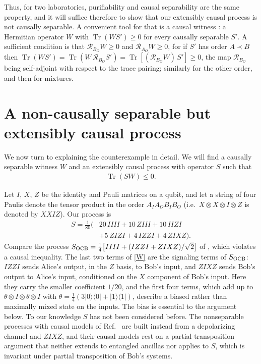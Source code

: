 \documentclass[aps,prl,reprint,superscriptaddress,nofootinbib,longbibliography,raggedbottom]{revtex4-2}
\DeclareMathOperator{\Tr}{Tr}
\newcommand{\R}{\mathcal R}
\newcommand{\ket}[1]{\lvert #1\rangle}
\newcommand{\bra}[1]{\langle #1\rvert}
\newcommand{\proj}[1]{\ket{#1}\!\bra{#1}}
\begin{document}
Thus, for two laboratories, purifiability and causal separability are the
same property, and it will suffice therefore to show that our extensibly causal process is not causally
separable. A convenient tool for that is a causal witness \cite{Witnesses}: a Hermitian operator $W$ with
$\Tr(WS')\geq0$ for every causally separable $S'$. A sufficient condition
is that $\R_{B_O}W\geq0$ and $\R_{A_O}W\geq0$, for if $S'$ has order
$A\prec B$ then
$\Tr(WS')=\Tr(W\,\R_{B_O}S')=\Tr[(\R_{B_O}W)\,S']\geq0$, the map
$\R_{B_O}$ being self-adjoint with respect to the trace pairing; similarly
for the other order, and then for mixtures.


\medskip
\section{A non-causally separable but extensibly causal process}\label{sec:main}
We now turn to explaining the counterexample in detail. We will find a causally separable witness $W$ and an extensibly causal process with operator $S$ such that
\begin{align}
\Tr(SW)\leq0.
\end{align}


Let $I$, $X$, $Z$ be the identity and Pauli matrices on a qubit, and let
a string of four Paulis denote the tensor product in the order $A_IA_OB_IB_O$ (i.e.\ $X \otimes X \otimes I \otimes Z$ is denoted by $XXIZ$). Our
process is
\begin{equation}\label{W}
\begin{split}
S=\frac1{80}\bigl(&20\,IIII+10\,ZIII+10\,IIZI\\
&+5\,ZIZI+4\,IZZI+4\,ZIXZ\bigr).
\end{split}
\end{equation}
Compare the process
$S_{\rm OCB}=\frac14\bigl[IIII+(IZZI+ZIXZ)/\sqrt2\bigr]$ of \cite{OCB},
which violates a causal inequality. The last two terms of \eqref{W} are the
signaling terms of $S_{\rm OCB}$: $IZZI$ sends Alice's output, in the $Z$
basis, to Bob's input, and $ZIXZ$ sends Bob's output to Alice's input,
conditioned on the $X$ component of Bob's input. Here they carry the
smaller coefficient $1/20$, and the first
four terms, which add up to $\theta\otimes I\otimes\theta\otimes I$ with
$\theta=\frac14(3\proj0+\proj1)$, describe a biased rather than maximally
mixed state on the inputs. The bias is essential to the argument below. To our knowledge $S$ has not been considered before. The nonseparable
processes with causal models of Ref.~\cite{FAB} are built instead from a
depolarizing channel and $ZIXZ$, and their causal models rest on a
partial-transposition argument that neither extends to entangled ancillas
nor applies to $S$, which is invariant under partial transposition of
Bob's systems.
\end{document}
